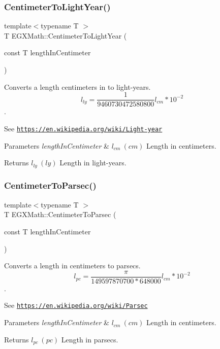 \subsubsection{\texorpdfstring{Centimeter\+To\+Light\+Year()}{CentimeterToLightYear()}}
{\footnotesize\ttfamily template$<$typename T $>$ \\
T E\+G\+X\+Math\+::\+Centimeter\+To\+Light\+Year (\begin{DoxyParamCaption}\item[{const T}]{length\+In\+Centimeter }\end{DoxyParamCaption})}



Converts a length centimeters in to light-\/years. \[ l_{ly}= \frac{1}{9460730472580800} l_{cm} * 10^{-2} \]. 

See \href{https://en.wikipedia.org/wiki/Light-year}{\tt https\+://en.\+wikipedia.\+org/wiki/\+Light-\/year} 
\begin{DoxyParams}{Parameters}
{\em length\+In\+Centimeter} & $ l_{cm}\ (cm)$ Length in centimeters. \\
\hline
\end{DoxyParams}
\begin{DoxyReturn}{Returns}
$ l_{ly}\ (ly)$ Length in light-\/years. 
\end{DoxyReturn}
\mbox{\label{group___e_g_x_math-_conversions-_length_conversions-_s_i-_centimeter-_astronomical_ga9e28cd6f9d5da2330cd5bf17af20cc8f}} 
\subsubsection{\texorpdfstring{Centimeter\+To\+Parsec()}{CentimeterToParsec()}}
{\footnotesize\ttfamily template$<$typename T $>$ \\
T E\+G\+X\+Math\+::\+Centimeter\+To\+Parsec (\begin{DoxyParamCaption}\item[{const T}]{length\+In\+Centimeter }\end{DoxyParamCaption})}



Converts a length in centimeters to parsecs. \[ l_{pc}=\frac{\pi}{149597870700 * 648000} l_{cm} * 10^{-2} \]. 

See \href{https://en.wikipedia.org/wiki/Parsec}{\tt https\+://en.\+wikipedia.\+org/wiki/\+Parsec} 
\begin{DoxyParams}{Parameters}
{\em length\+In\+Centimeter} & $ l_{cm}\ (cm)$ Length in centimeters. \\
\hline
\end{DoxyParams}
\begin{DoxyReturn}{Returns}
$ l_{pc}\ (pc)$ Length in parsecs. 
\end{DoxyReturn}
